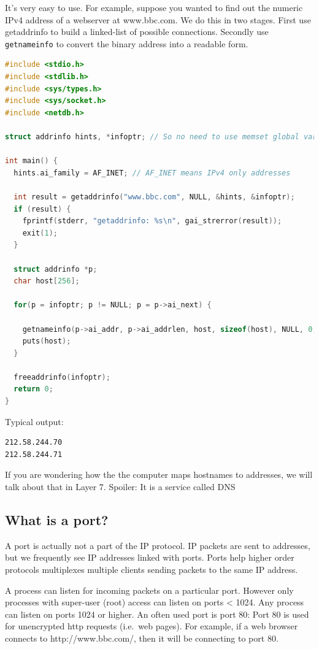 It's very easy to use. For example, suppose you wanted to find out the numeric IPv4 address of a webserver at www.bbc.com. We do this in two stages. First use getaddrinfo to build a linked-list of possible connections. Secondly use \texttt{getnameinfo} to convert the binary address into a readable form.

\begin{lstlisting}[language=C]
#include <stdio.h>
#include <stdlib.h>
#include <sys/types.h>
#include <sys/socket.h>
#include <netdb.h>

struct addrinfo hints, *infoptr; // So no need to use memset global variables

int main() {
  hints.ai_family = AF_INET; // AF_INET means IPv4 only addresses

  int result = getaddrinfo("www.bbc.com", NULL, &hints, &infoptr);
  if (result) {
    fprintf(stderr, "getaddrinfo: %s\n", gai_strerror(result));
    exit(1);
  }

  struct addrinfo *p;
  char host[256];

  for(p = infoptr; p != NULL; p = p->ai_next) {

    getnameinfo(p->ai_addr, p->ai_addrlen, host, sizeof(host), NULL, 0, NI_NUMERICHOST);
    puts(host);
  }

  freeaddrinfo(infoptr);
  return 0;
}
\end{lstlisting}

Typical output:

\begin{lstlisting}
212.58.244.70
212.58.244.71
\end{lstlisting}

If you are wondering how the the computer maps hostnames to addresses, we will talk about that in Layer 7. Spoiler: It is a service called DNS

\subsection{What is a port?}\label{what-is-a-port}

A port is actually not a part of the IP protocol. IP packets are sent to addresses, but we frequently see IP addresses linked with ports. Ports help higher order protocols multiplexes multiple clients sending packets to the same IP address.

A process can listen for incoming packets on a particular port. However only processes with super-user (root) access can listen on ports \textless{} 1024. Any process can listen on ports 1024 or higher. An often used port is port 80: Port 80 is used for unencrypted http requests (i.e.~web pages). For example, if a web browser connects to http://www.bbc.com/, then it will be connecting to port 80.

